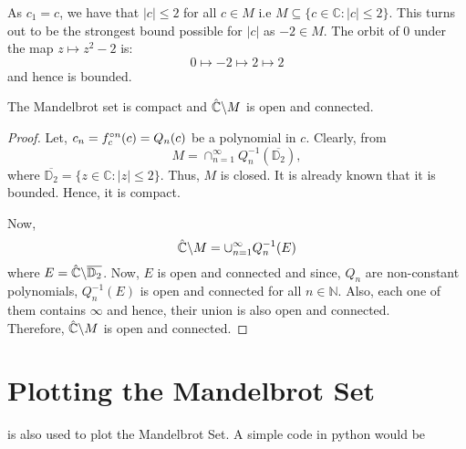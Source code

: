 As \( c_1=c \), we have that \( |c|\le 2 \) for all \( c\in M \) i.e \( M \subseteq \{c\in \mathbb{C}:|c|\le 2\} \). 
This turns out to be the strongest bound possible for \( |c| \)
as \( -2\in M \). The orbit of \( 0 \) under the map \( z\mapsto z^2-2 \) is: \[ 0\mapsto -2\mapsto 2\mapsto 2 \]
and hence is bounded.

\begin{theorem}
	The Mandelbrot set is compact and \( \hat{\mathbb{C}}\backslash M \) is open and connected.
\end{theorem}
\begin{proof}
	Let, \( c_n=\fcof[n](c)=Q_n(c) \) be a polynomial in \( c \). Clearly, from  \[
		M=\cap_{n=1}^{\infty}Q_n^{-1}(\overline{\mathbb{D}_2}),
	\] where \( \overline{\mathbb{D}_2}=\{z\in \mathbb{C}:|z|\le 2\} \).
	Thus, \( M \) is closed. It is already known that it is bounded. Hence, it is compact.

	Now, \[
		\hat{\mathbb{C}}\backslash M=\cup_{n=1}^\infty Q_n^{-1}(E)
	\] where \( E=\hat{\mathbb{C}}\backslash\overline{\mathbb{D}_2}\). Now, \( E \) is open and connected and 
	since, \( Q_n \) are non-constant polynomials, \( Q_n^{-1}(E) \) is open and connected for all \( n\in \mathbb{N} \).
	Also, each one of them contains \( \infty \) and hence, their union is also open and connected.\\
	Therefore, \( \hat{\mathbb{C}}\backslash M \) is open and connected.

\end{proof}

\section{Plotting the Mandelbrot Set}
 is also used to plot the Mandelbrot Set. A simple code in python would be
